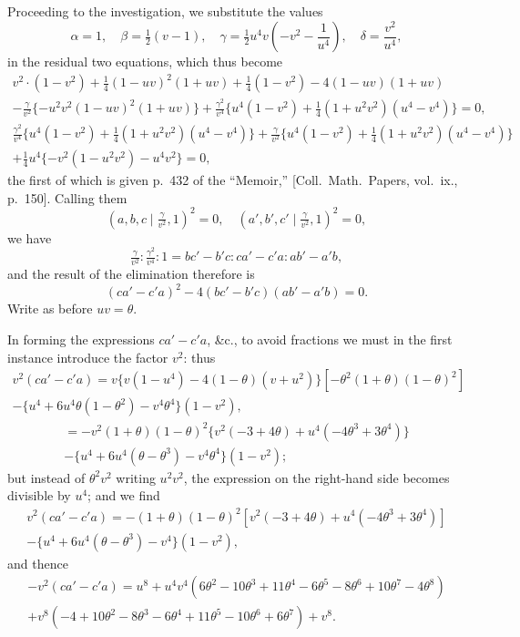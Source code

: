 \documentclass[12pt,a4paper]{article}
\begin{document}
\newpage
Proceeding to the investigation, we substitute the values
\[
\alpha = 1,\quad \beta = \tfrac{1}{2}(v - 1),\quad \gamma = \tfrac{1}{2}u^4 v\left(-v^2 - \frac{1}{u^4}\right),\quad \delta = \frac{v^2}{u^4},
\]
in the residual two equations, which thus become
\begin{gather*}
v^2 \cdot (1 - v^2) + \tfrac{1}{4}(1 - uv)^2(1 + uv) + \tfrac{1}{4}(1 - v^2) - 4(1 - uv)(1 + uv) \\
- \frac{\gamma}{v^2}\{-u^2 v^2 (1 - uv)^2 (1 + uv)\} + \frac{\gamma^2}{v^4}\{u^4(1 - v^2) + \tfrac{1}{4}(1 + u^2 v^2)(u^4 - v^4)\} = 0,
\end{gather*}
\begin{gather*}
\frac{\gamma^2}{v^4}\{u^4(1 - v^2) + \tfrac{1}{4}(1 + u^2 v^2)(u^4 - v^4)\} + \frac{\gamma}{v^2}\{u^4(1 - v^2) + \tfrac{1}{4}(1 + u^2 v^2)(u^4 - v^4)\} \\
+ \frac{1}{4}u^4\{-v^2(1 - u^2 v^2) - u^4 v^2\} = 0,
\end{gather*}
the first of which is given p.~432 of the ``Memoir,'' [Coll.\ Math.\ Papers, vol.\ ix., p.~150]. Calling them
\[
(a, b, c \mid \tfrac{\gamma}{v^2}, 1)^2 = 0,\quad (a', b', c' \mid \tfrac{\gamma}{v^2}, 1)^2 = 0,
\]
we have
\[
\tfrac{\gamma}{v^2} : \tfrac{\gamma^2}{v^4} : 1 = bc' - b'c : ca' - c'a : ab' - a'b,
\]
and the result of the elimination therefore is
\[
(ca' - c'a)^2 - 4(bc' - b'c)(ab' - a'b) = 0.
\]
Write as before $uv = \theta$.

In forming the expressions $ca' - c'a$, \&c., to avoid fractions we must in the first instance introduce the factor $v^2$: thus
\begin{multline*}
v^2(ca' - c'a) = v\{v(1 - u^4) - 4(1 - \theta)(v + u^2)\}[-\theta^2(1 + \theta)(1 - \theta)^2]\\
- \{u^4 + 6u^4\theta(1 - \theta^2) - v^4\theta^4\}(1 - v^2),
\end{multline*}
\begin{multline*}
= -v^2(1 + \theta)(1 - \theta)^2\{v^2(-3 + 4\theta) + u^4(-4\theta^3 + 3\theta^4)\}\\
- \{u^4 + 6u^4(\theta - \theta^3) - v^4\theta^4\}(1 - v^2);
\end{multline*}
but instead of $\theta^2 v^2$ writing $u^2 v^2$, the expression on the right-hand side becomes divisible by $u^4$; and we find
\begin{multline*}
v^2(ca' - c'a) = -(1 + \theta)(1 - \theta)^2[v^2(-3 + 4\theta) + u^4(-4\theta^3 + 3\theta^4)]\\
- \{u^4 + 6u^4(\theta - \theta^3) - v^4\}(1 - v^2),
\end{multline*}
and thence
\begin{multline*}
-v^2(ca' - c'a) = u^8 + u^4 v^4(6\theta^2 - 10\theta^3 + 11\theta^4 - 6\theta^5 - 8\theta^6 + 10\theta^7 - 4\theta^8)\\
+ v^8(-4 + 10\theta^2 - 8\theta^3 - 6\theta^4 + 11\theta^5 - 10\theta^6 + 6\theta^7) + v^8.
\end{multline*}
\end{document}
